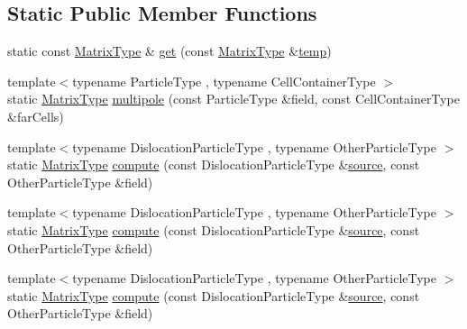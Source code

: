 \subsection*{Static Public Member Functions}
\begin{DoxyCompactItemize}
\item 
static const \hyperlink{structmodel_1_1_dislocation_displacement_a4eaccfbc1b90e521f051be8759244719}{Matrix\+Type} \& \hyperlink{structmodel_1_1_dislocation_displacement_a1006429c2d91062f4949ae4f200e7578}{get} (const \hyperlink{structmodel_1_1_dislocation_displacement_a4eaccfbc1b90e521f051be8759244719}{Matrix\+Type} \&\hyperlink{tube_plotter_8m_a905c521e05ec8042631a912b71d0454e}{temp})
\item 
{\footnotesize template$<$typename Particle\+Type , typename Cell\+Container\+Type $>$ }\\static \hyperlink{structmodel_1_1_dislocation_displacement_a4eaccfbc1b90e521f051be8759244719}{Matrix\+Type} \hyperlink{structmodel_1_1_dislocation_displacement_ad3e0b2eaa3e9458a4ca26d3220d4faa5}{multipole} (const Particle\+Type \&field, const Cell\+Container\+Type \&far\+Cells)
\item 
{\footnotesize template$<$typename Dislocation\+Particle\+Type , typename Other\+Particle\+Type $>$ }\\static \hyperlink{structmodel_1_1_dislocation_displacement_a4eaccfbc1b90e521f051be8759244719}{Matrix\+Type} \hyperlink{structmodel_1_1_dislocation_displacement_a46955908b6e8216c4cc94896cdac8fb6}{compute} (const Dislocation\+Particle\+Type \&\hyperlink{plot_network_8m_a6f3223812eea666f1fee426db5c8c563}{source}, const Other\+Particle\+Type \&field)
\item 
{\footnotesize template$<$typename Dislocation\+Particle\+Type , typename Other\+Particle\+Type $>$ }\\static \hyperlink{structmodel_1_1_dislocation_displacement_a4eaccfbc1b90e521f051be8759244719}{Matrix\+Type} \hyperlink{structmodel_1_1_dislocation_displacement_a46955908b6e8216c4cc94896cdac8fb6}{compute} (const Dislocation\+Particle\+Type \&\hyperlink{plot_network_8m_a6f3223812eea666f1fee426db5c8c563}{source}, const Other\+Particle\+Type \&field)
\item 
{\footnotesize template$<$typename Dislocation\+Particle\+Type , typename Other\+Particle\+Type $>$ }\\static \hyperlink{structmodel_1_1_dislocation_displacement_a4eaccfbc1b90e521f051be8759244719}{Matrix\+Type} \hyperlink{structmodel_1_1_dislocation_displacement_a46955908b6e8216c4cc94896cdac8fb6}{compute} (const Dislocation\+Particle\+Type \&\hyperlink{plot_network_8m_a6f3223812eea666f1fee426db5c8c563}{source}, const Other\+Particle\+Type \&field)
\end{DoxyCompactItemize}
